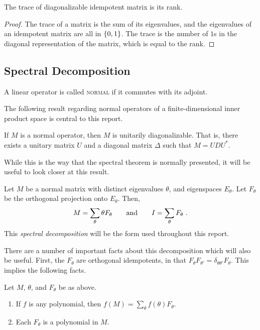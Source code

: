 \documentclass{report}
\begin{document}
      \begin{prop}
        The trace of diagonalizable idempotent matrix is its rank.
      \end{prop}

      \begin{proof}
        The trace of a matrix is the sum of its eigenvalues, and the eigenvalues
        of an idempotent matrix are all in $\left\lbrace 0, 1 \right\rbrace$.  The trace is the
        number of $1$s in the diagonal representation of the matrix, which is
        equal to the rank.
      \end{proof}

    \subsection{Spectral Decomposition}

      \begin{defn}
        A linear operator is called \textsc{normal} if it commutes with its
        adjoint.
      \end{defn}

      The following result regarding normal operators of a finite-dimensional
      inner product space is central to this report.

      \begin{thm}
        If $M$ is a normal operator, then $M$ is unitarily diagonalizable.  That
        is, there exists a unitary matrix $U$ and a diagonal matrix $\Delta$
        such that $M = UDU^*$.
      \end{thm}

      While this is the way that the spectral theorem is normally presented, it
      will be useful to look closer at this result.

      Let $M$ be a normal matrix with distinct eigenvalues $\theta$, and
      eigenspaces $E_\theta$.  Let $F_\theta$ be the orthogonal projection onto
      $E_\theta$.  Then,
      $$
        M = \sum_\theta \theta F_\theta \quad\quad\text{and}\quad\quad
        I = \sum_\theta F_\theta \ .
      $$
      This \textit{spectral decomposition} will be the form used throughout this
      report.

      There are a number of important facts about this decomposition which will
      also be useful.  First, the $F_\theta$ are orthogonal idempotents, in that
      $F_\theta F_{\theta'} = \delta_{\theta \theta'} F_\theta$.  This implies
      the following facts.

      \begin{prop}\label{prop:spectral-decomp-polynomial}
        Let $M$, $\theta$, and $F_\theta$ be as above.
        \begin{enumerate}
          \item If $f$ is any polynomial, then $f(M) = \sum_\theta f(\theta)
            F_\theta$.
          \item Each $F_\theta$ is a polynomial in $M$.
        \end{enumerate}
      \end{prop}
\end{document}
